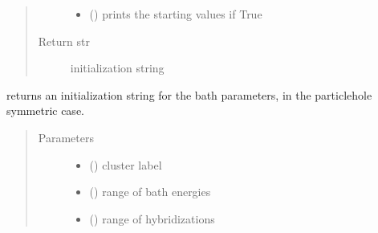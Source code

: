 \documentclass[letterpaper,10pt,english]{sphinxmanual}
\begin{document}
\begin{fulllineitems}
\begin{fulllineitems}
\begin{quote}
\begin{description}
\begin{itemize}
\item {} 
\sphinxAtStartPar
{} () \textendash{} prints the starting values if True

\end{itemize}

\item[{Return str}] \leavevmode
\sphinxAtStartPar
initialization string

\end{description}\end{quote}

\end{fulllineitems}


\begin{fulllineitems}
\label{\detokenize{cdmft:pyqcm.cdmft.general_bath.starting_values_PH}}
\sphinxAtStartPar
returns an initialization string for the bath parameters, in the particle\sphinxhyphen{}hole symmetric case.
\begin{quote}\begin{description}
\item[{Parameters}] \leavevmode\begin{itemize}
\item {} 
\sphinxAtStartPar
{} () \textendash{} cluster label

\item {} 
\sphinxAtStartPar
{} (\sphinxstyleliteralemphasis{\sphinxupquote{(}}\sphinxstyleliteralemphasis{\sphinxupquote{)}}) \textendash{} range of bath energies

\item {} 
\sphinxAtStartPar
{} (\sphinxstyleliteralemphasis{\sphinxupquote{(}}\sphinxstyleliteralemphasis{\sphinxupquote{)}}) \textendash{} range of hybridizations


\end{itemize}
\end{description}
\end{quote}
\end{fulllineitems}
\end{fulllineitems}
\end{document}
